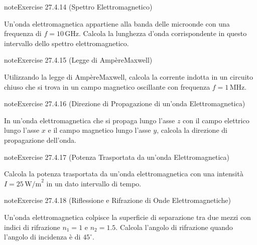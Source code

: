 \documentclass[letterpaper,10pt,italian]{jupyterBook}
\begin{document}
\begin{sphinxadmonition}{note}{Exercise 27.4.14 (Spettro Elettromagnetico)}



\sphinxAtStartPar
Un’onda elettromagnetica appartiene alla banda delle microonde con una frequenza di \(f = 10 \, \text{GHz}\). Calcola la lunghezza d’onda corrispondente in questo intervallo dello spettro elettromagnetico.
\end{sphinxadmonition}
 \label{exercise:ch/electromagnetism/em-waves-problems-exercise-14}

\begin{sphinxadmonition}{note}{Exercise 27.4.15 (Legge di Ampère\sphinxhyphen{}Maxwell)}



\sphinxAtStartPar
Utilizzando la legge di Ampère\sphinxhyphen{}Maxwell, calcola la corrente indotta in un circuito chiuso che si trova in un campo magnetico oscillante con frequenza \(f = 1 \, \text{MHz}\).
\end{sphinxadmonition}
 \label{exercise:ch/electromagnetism/em-waves-problems-exercise-15}

\begin{sphinxadmonition}{note}{Exercise 27.4.16 (Direzione di Propagazione di un’onda Elettromagnetica)}



\sphinxAtStartPar
In un’onda elettromagnetica che si propaga lungo l’asse \(z\) con il campo elettrico lungo l’asse \(x\) e il campo magnetico lungo l’asse \(y\), calcola la direzione di propagazione dell’onda.
\end{sphinxadmonition}
 \label{exercise:ch/electromagnetism/em-waves-problems-exercise-16}

\begin{sphinxadmonition}{note}{Exercise 27.4.17 (Potenza Trasportata da un’onda Elettromagnetica)}



\sphinxAtStartPar
Calcola la potenza trasportata da un’onda elettromagnetica con una intensità \(I = 25 \, \text{W/m}^2\) in un dato intervallo di tempo.
\end{sphinxadmonition}
 \label{exercise:ch/electromagnetism/em-waves-problems-exercise-17}

\begin{sphinxadmonition}{note}{Exercise 27.4.18 (Riflessione e Rifrazione di Onde Elettromagnetiche)}



\sphinxAtStartPar
Un’onda elettromagnetica colpisce la superficie di separazione tra due mezzi con indici di rifrazione \(n_1 = 1\) e \(n_2 = 1.5\). Calcola l’angolo di rifrazione quando l’angolo di incidenza è di \(45^\circ\).
\end{sphinxadmonition}
\end{document}
